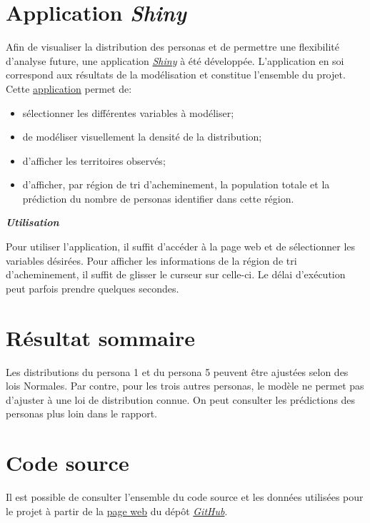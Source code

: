 \documentclass[11pt,french]{article}\usepackage[]{graphicx}\usepackage[]{color}
\newenvironment{moreInfo}[1]
	{\begin{mdframed}
	\textcolor{NavyBlue}{\huge \raisebox{-3.5pt}{\faInfo} 
	\hspace{0.5cm} \large\bfseries #1}\\[5pt]
	\normalsize
	\makebox[0.1\textwidth][l]{}	
	\begin{minipage}{10cm}}
	{	\end{minipage}
	\end{mdframed}}
\begin{document}
\section{Application \emph{Shiny}}

Afin de visualiser la distribution des personas et de permettre une flexibilité d'analyse future, une application \href{https://www.rstudio.com/products/shiny/}{\emph{Shiny}} à été développée. L'application en soi correspond aux résultats de la modélisation et constitue l'ensemble du projet. Cette \href{https://davebulaval.shinyapps.io/personnasIdentificateur/}{application} permet de:
\begin{itemize}
\item sélectionner les différentes variables à modéliser;
\item de modéliser visuellement la densité de la distribution;
\item d'afficher les territoires observés;
\item d'afficher, par région de tri d'acheminement, la population totale et la prédiction du nombre de personas identifier dans cette région.
\end{itemize}

\begin{moreInfo}{\color{NavyBlue}\emph{Utilisation}
     \color{black}}
Pour utiliser l'application, il suffit d'accéder à la page web et de sélectionner les variables désirées. Pour afficher les informations de la région de tri d'acheminement, il suffit de glisser le curseur sur celle-ci.
     \newline
     Le délai d'exécution peut parfois prendre quelques secondes. 
\end{moreInfo}

\section{Résultat sommaire}

Les distributions du persona 1 et du persona 5 peuvent être ajustées selon des lois Normales. Par contre, pour les trois autres personas, le modèle ne permet pas d'ajuster à une loi de distribution connue. On peut consulter les prédictions des personas plus loin dans le rapport.

\section{Code source}

Il est possible de consulter l'ensemble du code source et les données utilisées pour le projet à partir de la \href{https://davebulaval.github.io/Actulab_COOP/}{page web} du dépôt \href{https://github.com/davebulaval/Actulab_COOP}{\emph{GitHub}}.
\end{document}
